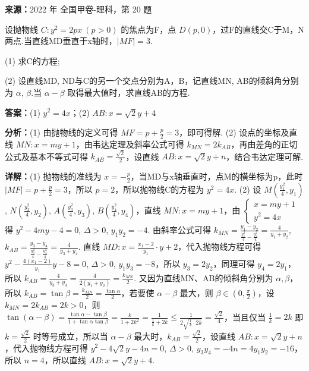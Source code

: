 \begin{question}[points=12]
\textbf{来源：}2022 年 全国甲卷-理科，第 20 题\par
设抛物线 $C:y^2=2px\ (p>0)$ 的焦点为F，点 $D(p,0)$，过F的直线交C于M，N两点.当直线MD垂直于x轴时，$|MF|=3$.

(1) 求C的方程;

(2) 设直线MD, ND与C的另一个交点分别为A，B，记直线MN, AB的倾斜角分别为 $\alpha$, $\beta$.当 $\alpha-\beta$ 取得最大值时，求直线AB的方程.
\begin{solution}
\textbf{答案：}(1) $y^2=4x$；(2) $AB: x=\sqrt{2}y+4$

\textbf{分析：}(1) 由抛物线的定义可得 $MF=p+\frac{p}{2}=3$，即可得解. (2) 设点的坐标及直线 $MN: x=my+1$，由韦达定理及斜率公式可得 $k_{MN}=2k_{AB}$，再由差角的正切公式及基本不等式可得 $k_{AB}=\frac{\sqrt{2}}{2}$，设直线 $AB: x=\sqrt{2}y+n$，结合韦达定理可解.

\textbf{详解：}(1) 抛物线的准线为 $x=-\frac{p}{2}$，当MD与x轴垂直时，点M的横坐标为p，此时 $|MF|=p+\frac{p}{2}=3$，所以 $p=2$，所以抛物线C的方程为 $y^2=4x$.
(2) 设 $M(\frac{y_1^2}{4},y_1)$, $N(\frac{y_2^2}{4},y_2)$, $A(\frac{y_3^2}{4},y_3)$, $B(\frac{y_4^2}{4},y_4)$，直线 $MN:x=my+1$，由 $\begin{cases} x=my+1 \\ y^2=4x \end{cases}$ 得 $y^2-4my-4=0$, $\Delta>0$, $y_1y_2=-4$. 由斜率公式可得 $k_{MN}=\frac{y_1-y_2}{\frac{y_1^2}{4}-\frac{y_2^2}{4}}=\frac{4}{y_1+y_2}$, $k_{AB}=\frac{y_3-y_4}{\frac{y_3^2}{4}-\frac{y_4^2}{4}}=\frac{4}{y_3+y_4}$. 直线 $MD:x=\frac{x_1-2}{y_1}\cdot y+2$，代入抛物线方程可得 $y^2-\frac{4(x_1-2)}{y_1}y-8=0$, $\Delta>0$, $y_1y_3=-8$，所以 $y_3=2y_2$，同理可得 $y_4=2y_1$，所以 $k_{AB}=\frac{4}{y_3+y_4}=\frac{4}{2(y_1+y_2)}=\frac{k_{MN}}{2}$. 又因为直线MN、AB的倾斜角分别为 $\alpha,\beta$，所以 $k_{AB}=\tan\beta=\frac{k_{MN}}{2}=\frac{\tan\alpha}{2}$，若要使 $\alpha-\beta$ 最大，则 $\beta\in(0,\frac{\pi}{2})$，设 $k_{MN}=2k_{AB}=2k>0$，则 $\tan(\alpha-\beta)=\frac{\tan\alpha-\tan\beta}{1+\tan\alpha\tan\beta}=\frac{k}{1+2k^2}=\frac{1}{\frac{1}{k}+2k}\leq\frac{1}{2\sqrt{\frac{1}{k}\cdot2k}}=\frac{\sqrt{2}}{4}$，当且仅当 $\frac{1}{k}=2k$ 即 $k=\frac{\sqrt{2}}{2}$ 时等号成立，所以当 $\alpha-\beta$ 最大时，$k_{AB}=\frac{\sqrt{2}}{2}$，设直线 $AB: x=\sqrt{2}y+n$，代入抛物线方程可得 $y^2-4\sqrt{2}y-4n=0$, $\Delta>0$, $y_3y_4=-4n=4y_1y_2=-16$，所以 $n=4$，所以直线 $AB: x=\sqrt{2}y+4$.
\end{solution}
\end{question}

